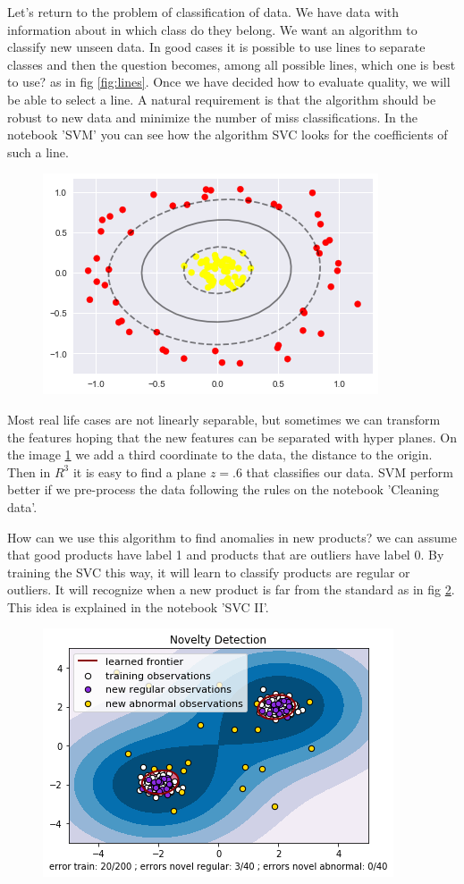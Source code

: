 \documentclass[11pt,letterpaper]{report}
\begin{document}
	Let's return to the problem of classification of data. We have data with information about in which class do they belong. We want an algorithm to classify new unseen data. In good cases it is possible to use lines to separate classes and then the question becomes, among all possible lines, which one is best to use? as in fig \ref{fig:lines}. Once we have decided how to evaluate quality, we will be able to select a line. A natural requirement is that the algorithm should be robust to new data and minimize the number of miss classifications. In the notebook 'SVM' you can see how the algorithm SVC looks for  the coefficients of such a line.

\begin{figure}[h!]
	\centering
	\includegraphics[width=0.45\linewidth]{figures/svc.png}
	\caption{}
	\label{fig:kernel}
\end{figure} 
	
 Most real life cases are not linearly separable, but sometimes we can transform the features hoping that the new features can be separated  with hyper planes. On the image \ref{fig:kernel} we add a third coordinate to the data, the distance to the origin. Then in $R^3$ it is easy to find a plane $z=.6$ that classifies our data. SVM perform better if we pre-process the data following the rules on the notebook 'Cleaning data'. 
 
How can we use this algorithm to find anomalies in new products? we can assume that good products have label 1 and products that are outliers have label 0. By training the SVC this way, it will learn to classify products are regular or outliers. It will recognize when a new product is far from the standard as in fig \ref{fig:novelty}. This idea is explained in the notebook 'SVC II'. 
	
	\begin{figure}[h!]
		\centering
		\includegraphics[width=0.45\linewidth]{figures/novelty.png}
		\caption{}
		\label{fig:novelty}
	\end{figure} 
	
\end{document}
